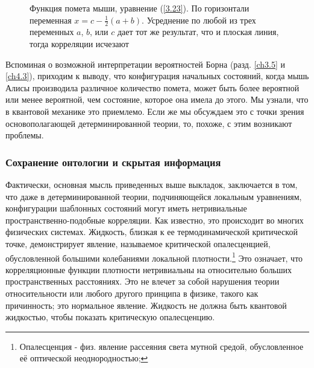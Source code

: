 \documentclass[main.tex]{subfiles}
\begin{document}
\begin{figure}[ht] %
	\begin{center}
		\caption{
		\label{i3.2}Функция помета мыши, уравнение (\ref{3.23}). По горизонтали переменная $x = c - \frac 1 2 (a + b)$. Усреднение по любой из трех переменных $a$, $b$, или $c$ дает тот же результат, что и плоская линия, тогда корреляции исчезают}
	\end {center}
\end {figure}

Вспоминая о возможной интерпретации вероятностей Борна (разд. \ref{ch3.5} и \ref{ch4.3}), приходим к выводу, что конфигурация начальных состояний, когда мышь Алисы производила различное количество помета, может быть более вероятной или менее вероятной, чем состояние, которое она имела до этого. Мы узнали, что в квантовой механике это приемлемо. Если же мы обсуждаем это с точки зрения основополагающей детерминированной теории, то, похоже, с этим возникают проблемы.

\subsubsection{Сохранение онтологии и скрытая информация}\label{ch3.7.1}

Фактически, основная мысль приведенных выше выкладок, заключается в том, что даже в детерминированной теории, подчиняющейся локальным уравнениям, конфигурации шаблонных состояний могут иметь нетривиальные пространственно-подобные корреляции. Как известно,  это происходит во многих физических системах. Жидкость, близкая к ее термодинамической критической точке, демонстрирует явление, называемое критической опалесценцией, обусловленной большими колебаниями локальной плотности.\footnote{Опалесценция - физ. явление рассеяния света мутной средой, обусловленное её оптической неоднородностью; } Это означает, что корреляционные функции плотности нетривиальны на относительно больших пространственных расстояниях. Это не влечет за собой нарушения теории относительности или любого другого принципа в физике, такого как причинность; это нормальное явление. Жидкость не должна быть квантовой жидкостью, чтобы показать критическую опалесценцию.
\end{document}
